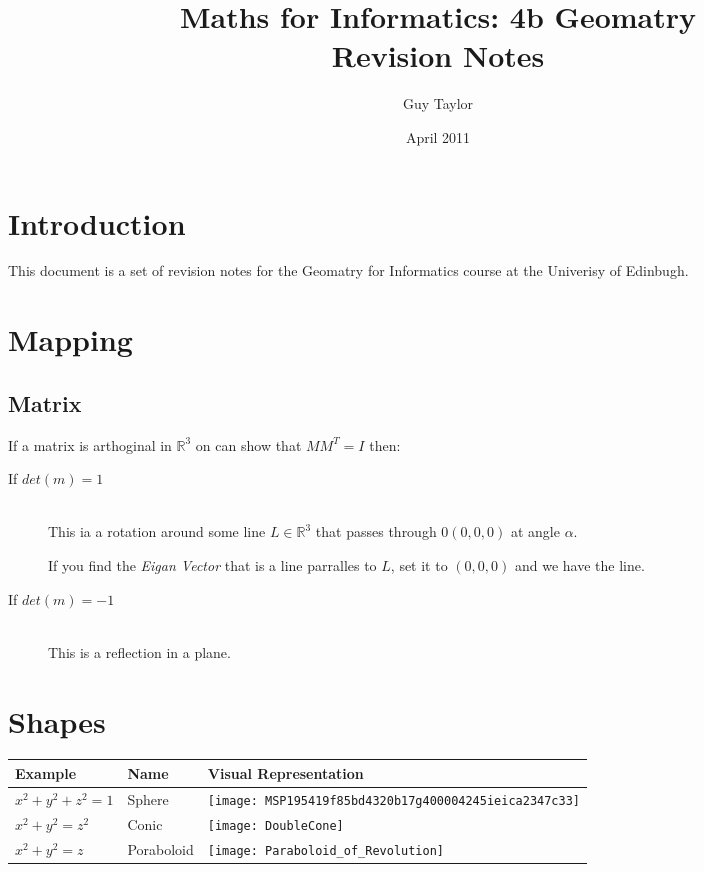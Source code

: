 \documentclass[11pt,twoside,a4paper]{article}
\begin{document}
  
  \graphicspath{{img//}}
  
  \title{Maths for Informatics: 4b Geomatry \\Revision Notes}
  \author{Guy Taylor}
  \date{April 2011}
  
  \maketitle
  
  \tableofcontents
  
  \section{Introduction}
    This document is a set of revision notes for the Geomatry for Informatics course at the Univerisy of Edinbugh.
  
  \clearpage
  \section{Mapping}
    \subsection{Matrix}
      If a matrix is arthoginal in \(\mathbb{R}^3\) on can show that \(MM^T = I\) then:
      \begin{description}
        \item[If \(det(m) = 1\)] \hfill \\
          This ia a rotation around some line \(L \in \mathbb{R}^3\) that passes through \(0 (0,0,0)\) at angle \(\alpha\).
          
          If you find the \textit{Eigan Vector} that is a line parralles to \(L\), set it to \((0,0,0)\) and we have the line.
        
        \item[If \(det(m) = -1\)] \hfill \\
          This is a reflection in a plane.
      \end{description}
  
  \section{Shapes}
    \begin{tabular}{l|l|l}
      \textbf{Example}  & \textbf{Name} & \textbf{Visual Representation} \\ \hline
      \(x^2+y^2+z^2=1\) & Sphere        & \texttt{[image: MSP195419f85bd4320b17g400004245ieica2347c33]}\cite{sphere_graphic} \\
      \(x^2+y^2=z^2\)   & Conic         & \texttt{[image: DoubleCone]} \\
      \(x^2+y^2=z\)     & Poraboloid    & \texttt{[image: Paraboloid\_of\_Revolution]}  \\
    \end{tabular}
    
\end{document}
